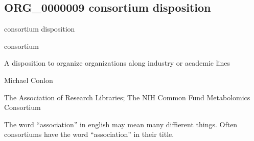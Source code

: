 \documentclass[letterpaper,10pt,english]{sphinxmanual}
\begin{document}
\subsection{ORG\_0000009 \sphinxhyphen{} consortium disposition}
\label{\detokenize{doc-ORG_0000009:org-0000009-consortium-disposition}}\label{\detokenize{doc-ORG_0000009:index-0}}\label{\detokenize{doc-ORG_0000009::doc}}
\begin{sphinxShadowBox}

\sphinxAtStartPar
consortium disposition
\end{sphinxShadowBox}

\begin{sphinxShadowBox}

\sphinxAtStartPar
consortium
\end{sphinxShadowBox}

\begin{sphinxShadowBox}

\sphinxAtStartPar
{\hyperref[\detokenize{doc-BFO_0000016::doc}]{}}
\end{sphinxShadowBox}

\begin{sphinxShadowBox}

\sphinxAtStartPar
A disposition to organize organizations along industry or academic lines
\end{sphinxShadowBox}

\begin{sphinxShadowBox}

\sphinxAtStartPar
Michael Conlon 
\end{sphinxShadowBox}

\begin{sphinxShadowBox}

\sphinxAtStartPar
The Association of Research Libraries; The NIH Common Fund Metabolomics Consortium
\end{sphinxShadowBox}

\begin{sphinxShadowBox}

\sphinxAtStartPar
The word “association” in english may mean many diffierent things.  Often consortiums have the word “association” in their title.
\end{sphinxShadowBox}
\end{document}
